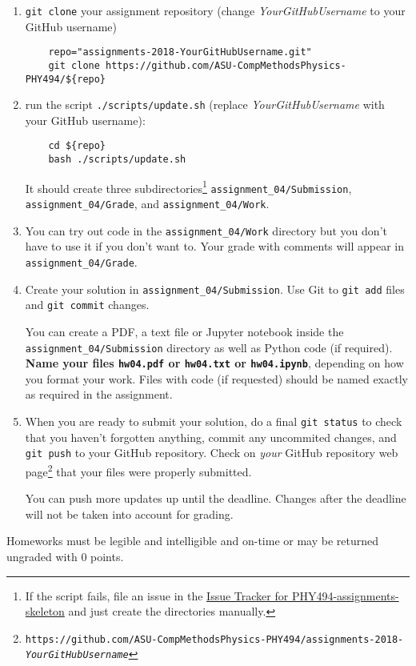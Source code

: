 \documentclass[letterpaper]{scrartcl}
\newcommand{\anumber}{4}
\newcommand{\anum}{0\anumber}
\begin{document}
\begin{enumerate}
\item \texttt{git clone} your assignment repository (change
  \emph{YourGitHubUsername} to your GitHub username)
  \begin{verbatim}
    repo="assignments-2018-YourGitHubUsername.git" 
    git clone https://github.com/ASU-CompMethodsPhysics-PHY494/${repo}
  \end{verbatim}
\item run the script
  \texttt{./scripts/update.sh} (replace \emph{YourGitHubUsername} with
  your GitHub username):
  \begin{verbatim}
    cd ${repo} 
    bash ./scripts/update.sh
  \end{verbatim}
  It should create three subdirectories\footnote{If the script fails,
    file an issue in the
    \href{https://github.com/ASU-CompMethodsPhysics-PHY494/PHY494-assignments-skeleton/issues}{Issue
      Tracker for PHY494-assignments-skeleton} and just create the
    directories manually.} \texttt{assignment\_\anum/Submission},
  \texttt{assignment\_\anum/Grade}, and
  \texttt{assignment\_\anum/Work}.
\item You can try out code in the \texttt{assignment\_\anum/Work}
  directory but you don't have to use it if you don't want to. Your
  grade with comments will appear in
  \texttt{assignment\_\anum/Grade}.
\item Create your solution in
  \texttt{assignment\_\anum/Submission}. Use Git to \texttt{git
    add} files and \texttt{git commit} changes.

  You can create a PDF, a text file or Jupyter notebook inside the
  \texttt{assignment\_\anum/Submission} directory as well as Python
  code (if required). \textbf{Name your files \texttt{hw\anum.pdf} or
    \texttt{hw\anum.txt} or \texttt{hw\anum.ipynb}}, depending on how
  you format your work. Files with code (if requested) should be named
  exactly as required in the assignment.
\item When you are ready to submit your solution, do a final
  \texttt{git status} to check that you haven't forgotten anything,
  commit any uncommited changes, and \texttt{git push} to your GitHub
  repository. Check on \emph{your} GitHub repository web
  page\footnote{\texttt{https://github.com/ASU-CompMethodsPhysics-PHY494/assignments-2018-\emph{YourGitHubUsername}}}
  that your files were properly submitted.

  You can push more updates up until the deadline. Changes after the
  deadline will not be taken into account for grading.
\end{enumerate}
Homeworks must be legible and intelligible and on-time or may  be
returned ungraded with 0 points.
\end{document}
